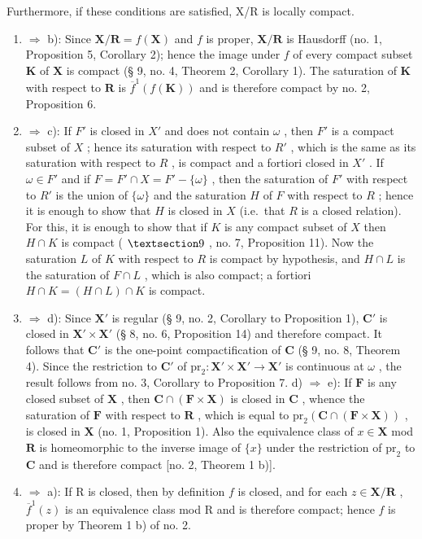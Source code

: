 Furthermore, if these conditions are satisfied, X/R is locally compact.

\begin{enumerate}
\def\labelenumi{\alph{enumi})}
\item
  \(\Longrightarrow\) b): Since \(\mathbf{X} / \mathbf{R} = f(\mathbf{X})\) and \(f\) is proper, \(\mathbf{X} / \mathbf{R}\) is Hausdorff (no. 1, Proposition 5, Corollary 2); hence the image under \(f\) of every compact subset \(\mathbf{K}\) of \(\mathbf{X}\) is compact (§ 9, no. 4, Theorem 2, Corollary 1). The saturation of \(\mathbf{K}\) with respect to \(\mathbf{R}\) is \(\overline{f}^1(f(\mathbf{K}))\) and is therefore compact by no. 2, Proposition 6.
\item
  \(\Longrightarrow\) c): If \(F'\) is closed in \(X'\) and does not contain \(\omega\) , then \(F'\) is a compact subset of \(X\) ; hence its saturation with respect to \(R'\) , which is the same as its saturation with respect to \(R\) , is compact and a fortiori closed in \(X'\) . If \(\omega \in F'\) and if \(F = F' \cap X = F' - \{\omega\}\) , then the saturation of \(F'\) with respect to \(R'\) is the union of \(\{\omega\}\) and the saturation \(H\) of \(F\) with respect to \(R\) ; hence it is enough to show that \(H\) is closed in \(X\) (i.e.~that \(R\) is a closed relation). For this, it is enough to show that if \(K\) is any compact subset of \(X\) then \(H \cap K\) is compact ( \(\S 9\) , no. 7, Proposition 11). Now the saturation \(L\) of \(K\) with respect to \(R\) is compact by hypothesis, and \(H \cap L\) is the saturation of \(F \cap L\) , which is also compact; a fortiori \(H \cap K = (H \cap L) \cap K\) is compact.
\item
  \(\Longrightarrow\) d): Since \(\mathbf{X}'\) is regular (§ 9, no. 2, Corollary to Proposition 1), \(\mathbf{C}'\) is closed in \(\mathbf{X}' \times \mathbf{X}'\) (§ 8, no. 6, Proposition 14) and therefore compact. It follows that \(\mathbf{C}'\) is the one-point compactification of \(\mathbf{C}\) (§ 9, no. 8, Theorem 4). Since the restriction to \(\mathbf{C}'\) of \(\mathrm{pr}_2: \mathbf{X}' \times \mathbf{X}' \to \mathbf{X}'\) is continuous at \(\omega\) , the result follows from no. 3, Corollary to Proposition 7. d) \(\Longrightarrow\) e): If \(\mathbf{F}\) is any closed subset of \(\mathbf{X}\) , then \(\mathbf{C} \cap (\mathbf{F} \times \mathbf{X})\) is closed in \(\mathbf{C}\) , whence the saturation of \(\mathbf{F}\) with respect to \(\mathbf{R}\) , which is equal to \(\mathrm{pr}_2(\mathbf{C} \cap (\mathbf{F} \times \mathbf{X}))\) , is closed in \(\mathbf{X}\) (no. 1, Proposition 1). Also the equivalence class of \(x \in \mathbf{X}\) mod \(\mathbf{R}\) is homeomorphic to the inverse image of \(\{x\}\) under the restriction of \(\mathrm{pr}_2\) to \(\mathbf{C}\) and is therefore compact {[}no. 2, Theorem 1 b){]}.
\item
  \(\Rightarrow\) a): If R is closed, then by definition \(f\) is closed, and for each \(z \in \mathbf{X} / \mathbf{R}\) , \(\overline{f}^1(z)\) is an equivalence class mod R and is therefore compact; hence \(f\) is proper by Theorem 1 b) of no. 2.
\end{enumerate}

